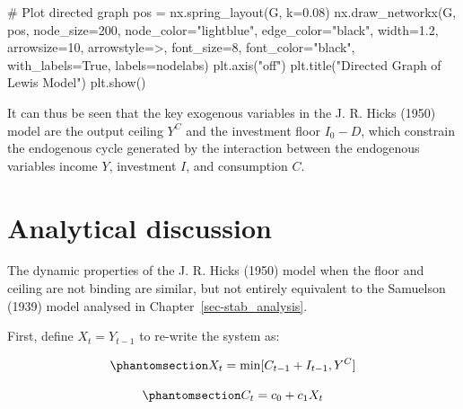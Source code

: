 \documentclass[
  letterpaper,
  DIV=11,
  numbers=noendperiod]{scrreprt}
\newenvironment{Shaded}{\begin{snugshade}}{\end{snugshade}}
\newcommand{\CommentTok}[1]{\textcolor[rgb]{0.37,0.37,0.37}{#1}}
\newcommand{\DecValTok}[1]{\textcolor[rgb]{0.68,0.00,0.00}{#1}}
\newcommand{\FloatTok}[1]{\textcolor[rgb]{0.68,0.00,0.00}{#1}}
\newcommand{\NormalTok}[1]{\textcolor[rgb]{0.00,0.23,0.31}{#1}}
\newcommand{\OperatorTok}[1]{\textcolor[rgb]{0.37,0.37,0.37}{#1}}
\newcommand{\StringTok}[1]{\textcolor[rgb]{0.13,0.47,0.30}{#1}}
\newcommand{\VariableTok}[1]{\textcolor[rgb]{0.07,0.07,0.07}{#1}}
\begin{document}
\begin{tcolorbox}
\begin{Shaded}
\begin{Highlighting}[]
\CommentTok{\# Plot directed graph}
\NormalTok{pos }\OperatorTok{=}\NormalTok{ nx.spring\_layout(G, k}\OperatorTok{=}\FloatTok{0.08}\NormalTok{)}
\NormalTok{nx.draw\_networkx(G, pos, node\_size}\OperatorTok{=}\DecValTok{200}\NormalTok{, node\_color}\OperatorTok{=}\StringTok{"lightblue"}\NormalTok{, }
\NormalTok{                 edge\_color}\OperatorTok{=}\StringTok{"black"}\NormalTok{, width}\OperatorTok{=}\FloatTok{1.2}\NormalTok{, arrowsize}\OperatorTok{=}\DecValTok{10}\NormalTok{, }
\NormalTok{                 arrowstyle}\OperatorTok{=}\StringTok{\textquotesingle{}{-}\textgreater{}\textquotesingle{}}\NormalTok{, font\_size}\OperatorTok{=}\DecValTok{8}\NormalTok{, font\_color}\OperatorTok{=}\StringTok{"black"}\NormalTok{,}
\NormalTok{                 with\_labels}\OperatorTok{=}\VariableTok{True}\NormalTok{, labels}\OperatorTok{=}\NormalTok{nodelabs)}
\NormalTok{plt.axis(}\StringTok{"off"}\NormalTok{)}
\NormalTok{plt.title(}\StringTok{"Directed Graph of Lewis Model"}\NormalTok{)}
\NormalTok{plt.show()}
\end{Highlighting}
\end{Shaded}

\end{tcolorbox}

It can thus be seen that the key exogenous variables in the J. R. Hicks
(1950) model are the output ceiling \(Y^C\) and the investment floor
\(I_0 - D\), which constrain the endogenous cycle generated by the
interaction between the endogenous variables income \(Y\), investment
\(I\), and consumption \(C\).

\section{Analytical discussion}\label{analytical-discussion-11}

The dynamic properties of the J. R. Hicks (1950) model when the floor
and ceiling are not binding are similar, but not entirely equivalent to
the Samuelson (1939) model analysed in Chapter~\ref{sec-stab_analysis}.

First, define \(X_t = Y_{t-1}\) to re-write the system as:

\begin{equation}\phantomsection\label{eq-hicks_X}{
  X_{t}=\min[C_{t-1} + I_{t-1}, Y^C] 
}\end{equation}

\begin{equation}\phantomsection\label{eq-hicks_C_mod}{
C_{t} = c_0 + c_1 X_{t}
}\end{equation}
\end{document}
